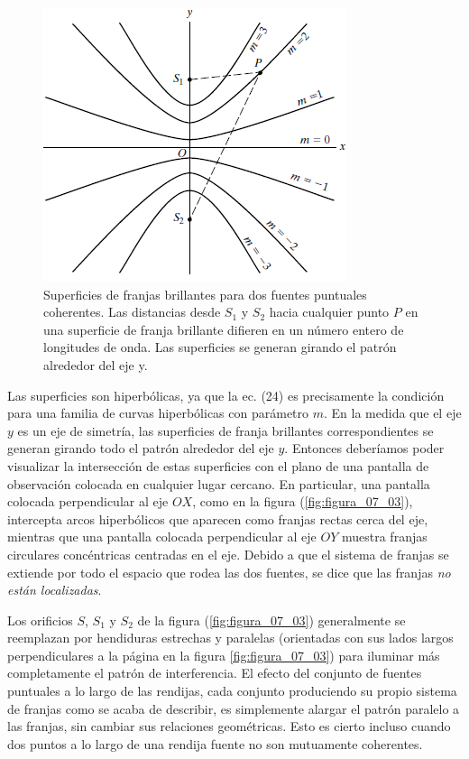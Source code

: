 \documentclass[14pt]{extarticle}
\begin{document}
\begin{figure}[H]
    \centering
    \includegraphics[scale=0.8]{Imagenes/Interferencia2_06.png}
    \caption{Superficies de franjas brillantes para dos fuentes puntuales coherentes. Las distancias desde $S_{1}$ y $S_{2}$ hacia cualquier punto $P$ en una superficie de franja brillante difieren en un número entero de longitudes de onda. Las superficies se generan girando el patrón alrededor del eje y.}
    \label{fig:figura_07_06}
\end{figure}
Las superficies son hiperbólicas, ya que la ec. (24) es precisamente la condición para una familia de curvas hiperbólicas con parámetro $m$. En la medida que el eje $y$ es un eje de simetría, las superficies de franja brillantes correspondientes se generan girando todo el patrón alrededor del eje $y$. Entonces deberíamos poder visualizar la intersección de estas superficies con el plano de una pantalla de observación colocada en cualquier lugar cercano. En particular, una pantalla colocada perpendicular al eje $OX$, como en la figura (\ref{fig:figura_07_03}), intercepta arcos hiperbólicos que aparecen como franjas rectas cerca del eje, mientras que una pantalla colocada perpendicular al eje $OY$ muestra franjas circulares concéntricas centradas en el eje. Debido a que el sistema de franjas se extiende por todo el espacio que rodea las dos fuentes, se dice que las franjas \textit{no están localizadas}.
\par
Los orificios $S$, $S_{1}$ y $S_{2}$ de la figura (\ref{fig:figura_07_03}) generalmente se reemplazan por hendiduras estrechas y paralelas (orientadas con sus lados largos perpendiculares a la página en la figura \ref{fig:figura_07_03}) para iluminar más completamente el patrón de interferencia. El efecto del conjunto de fuentes puntuales a lo largo de las rendijas, cada conjunto produciendo su propio sistema de franjas como se acaba de describir, es simplemente alargar el patrón paralelo a las franjas, sin cambiar sus relaciones geométricas. Esto es cierto incluso cuando dos puntos a lo largo de una rendija fuente no son mutuamente coherentes.
\end{document}
